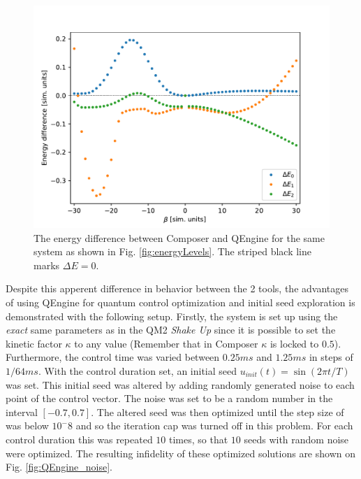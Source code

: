 \documentclass[a4paper, twocolumn]{revtex4-1}
\begin{document}
\begin{figure}
	\includegraphics[width=\columnwidth]{graphics/stateAnalysis/energyDiffQEngineComp.pdf}
	\caption{The energy difference between Composer and QEngine for the same system as shown in Fig. \ref{fig:energyLevels}. The striped black line marks $\Delta E=0$.}
	\label{fig:QEngine_energydiff}
\end{figure}

Despite this apperent difference in behavior between the 2 tools, the advantages of using QEngine for quantum control optimization and initial seed exploration is demonstrated with the following setup. Firstly, the system is set up using the \textit{exact} same parameters as in the QM2 \textit{Shake Up} since it is possible to set the kinetic factor $\kappa$ to any value (Remember that in Composer $\kappa$ is locked to $0.5$). Furthermore, the control time was varied between $0.25 ms$ and $1.25 ms$ in steps of $1/64 ms$. With the control duration set, an initial seed $u_{init}(t) = \sin(2\pi t/T)$ was set. This initial seed was altered by adding randomly generated noise to each point of the control vector. The noise was set to be a random number in the interval $[-0.7, 0.7]$. The altered seed was then optimized until the step size of  was below $10^-8$ and so the iteration cap was turned off in this problem. For each control duration this was repeated $10$ times, so that $10$ seeds with random noise were optimized. The resulting infidelity of these optimized solutions are shown on Fig. \ref{fig:QEngine_noise}. 
\end{document}
